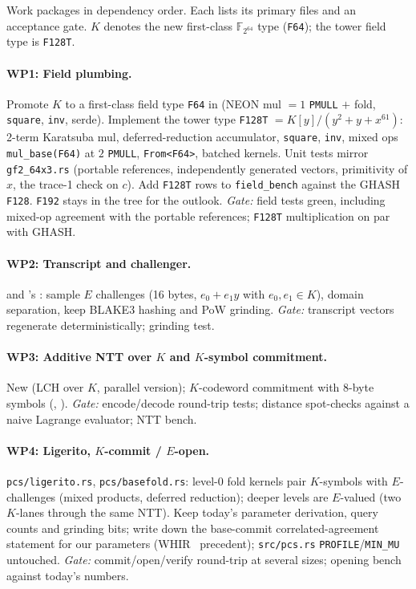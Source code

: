 \documentclass[11pt]{article}
\newcommand{\F}{\mathbb{F}}
\newcommand{\K}{K}            %
\newcommand{\E}{E}            %
\newcommand{\WP}[1]{\textbf{WP#1}}
\begin{document}
Work packages in dependency order. Each lists its primary files and an
acceptance gate. $\K$ denotes the new first-class $\F_{2^{64}}$ type
(\texttt{F64}); the tower field type is \texttt{F128T}.

\paragraph{\WP{1}: Field plumbing.}
Promote $\K$ to a first-class field type \texttt{F64} in
 (NEON mul $=1$ \texttt{PMULL} $+$
fold, \texttt{square}, \texttt{inv}, serde). Implement the tower type
\texttt{F128T} $=\K[y]/(y^2+y+x^{61})$: 2-term Karatsuba mul,
deferred-reduction accumulator, \texttt{square}, \texttt{inv}, mixed ops
\texttt{mul\_base(F64)} at $2$ \texttt{PMULL}, \texttt{From<F64>}, batched
kernels. Unit tests mirror \texttt{gf2\_64x3.rs} (portable references,
independently generated vectors, primitivity of $x$, the trace-1 check on
$c$). Add \texttt{F128T} rows to \texttt{field\_bench} against the GHASH
\texttt{F128}. \texttt{F192} stays in the tree for the outlook.
\emph{Gate:} field tests green, including mixed-op agreement with the
portable references; \texttt{F128T} multiplication on par with GHASH.

\paragraph{\WP{2}: Transcript and challenger.}
 and 's :
sample $\E$ challenges (16 bytes, $e_0+e_1y$ with $e_0,e_1\in\K$), domain
separation, keep BLAKE3 hashing and PoW grinding.
\emph{Gate:} transcript vectors regenerate deterministically; grinding test.

\paragraph{\WP{3}: Additive NTT over $\K$ and $\K$-symbol commitment.}
New  (LCH over $\K$, parallel version);
$\K$-codeword commitment with 8-byte symbols (,
).
\emph{Gate:} encode/decode round-trip tests; distance spot-checks against a
naive Lagrange evaluator; NTT bench.

\paragraph{\WP{4}: Ligerito, $\K$-commit / $\E$-open.}
\texttt{pcs/ligerito.rs}, \texttt{pcs/basefold.rs}: level-0 fold kernels
pair $\K$-symbols with $\E$-challenges (mixed products, deferred
reduction); deeper levels are $\E$-valued (two $\K$-lanes through the same
NTT). Keep today's parameter derivation, query counts and grinding bits;
write down the base-commit correlated-agreement statement for our
parameters (WHIR~\cite{whir} precedent); \texttt{src/pcs.rs}
\texttt{PROFILE}/\texttt{MIN\_MU} untouched.
\emph{Gate:} commit/open/verify round-trip at several sizes; opening bench
against today's numbers.
\end{document}
